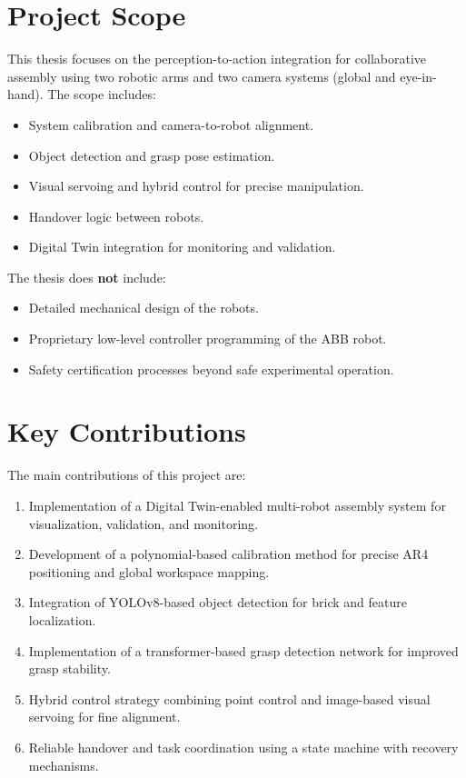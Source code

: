 \section{Project Scope}
This thesis focuses on the perception-to-action integration for collaborative assembly using two robotic arms and two camera systems (global and eye-in-hand). The scope includes:
\begin{itemize}
    \item System calibration and camera-to-robot alignment.
    \item Object detection and grasp pose estimation.
    \item Visual servoing and hybrid control for precise manipulation.
    \item Handover logic between robots.
    \item Digital Twin integration for monitoring and validation.
\end{itemize}

The thesis does \textbf{not} include:
\begin{itemize}
    \item Detailed mechanical design of the robots.
    \item Proprietary low-level controller programming of the ABB robot.
    \item Safety certification processes beyond safe experimental operation.
\end{itemize}

\section{Key Contributions}
The main contributions of this project are:
\begin{enumerate}
    \item Implementation of a Digital Twin-enabled multi-robot assembly system for visualization, validation, and monitoring.
    \item Development of a polynomial-based calibration method for precise AR4 positioning and global workspace mapping.
    \item Integration of YOLOv8-based object detection for brick and feature localization.
    \item Implementation of a transformer-based grasp detection network for improved grasp stability.
    \item Hybrid control strategy combining point control and image-based visual servoing for fine alignment.
    \item Reliable handover and task coordination using a state machine with recovery mechanisms.
\end{enumerate}

